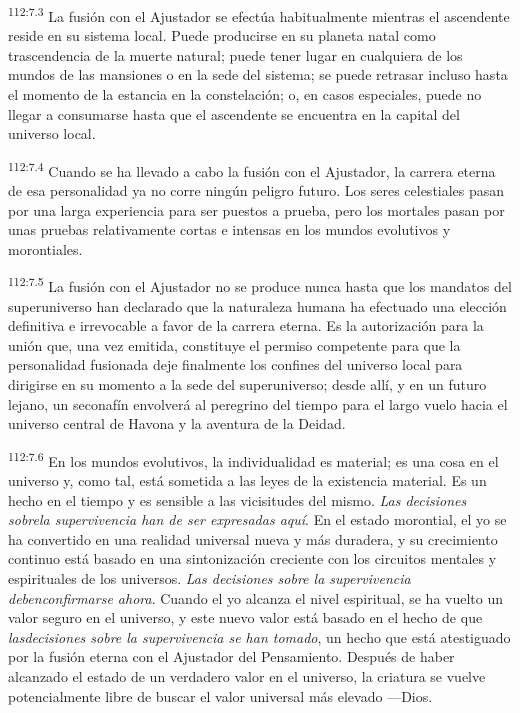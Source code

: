 \par
\textsuperscript{112:7.3} La fusión con el Ajustador se efectúa habitualmente mientras el ascendente reside en su sistema local. Puede producirse en su planeta natal como trascendencia de la muerte natural; puede tener lugar en cualquiera de los mundos de las mansiones o en la sede del sistema; se puede retrasar incluso hasta el momento de la estancia en la constelación; o, en casos especiales, puede no llegar a consumarse hasta que el ascendente se encuentra en la capital del universo local.

\par
\textsuperscript{112:7.4} Cuando se ha llevado a cabo la fusión con el Ajustador, la carrera eterna de esa personalidad ya no corre ningún peligro futuro. Los seres celestiales pasan por una larga experiencia para ser puestos a prueba, pero los mortales pasan por unas pruebas relativamente cortas e intensas en los mundos evolutivos y morontiales.

\par
\textsuperscript{112:7.5} La fusión con el Ajustador no se produce nunca hasta que los mandatos del superuniverso han declarado que la naturaleza humana ha efectuado una elección definitiva e irrevocable a favor de la carrera eterna. Es la autorización para la unión que, una vez emitida, constituye el permiso competente para que la personalidad fusionada deje finalmente los confines del universo local para dirigirse en su momento a la sede del superuniverso; desde allí, y en un futuro lejano, un seconafín envolverá al peregrino del tiempo para el largo vuelo hacia el universo central de Havona y la aventura de la Deidad.

\par
\textsuperscript{112:7.6} En los mundos evolutivos, la individualidad es material; es una cosa en el universo y, como tal, está sometida a las leyes de la existencia material. Es un hecho en el tiempo y es sensible a las vicisitudes del mismo. \textit{Las decisiones sobrela supervivencia han de ser expresadas aquí}. En el estado morontial, el yo se ha convertido en una realidad universal nueva y más duradera, y su crecimiento continuo está basado en una sintonización creciente con los circuitos mentales y espirituales de los universos. \textit{Las decisiones sobre la supervivencia debenconfirmarse ahora}. Cuando el yo alcanza el nivel espiritual, se ha vuelto un valor seguro en el universo, y este nuevo valor está basado en el hecho de que \textit{lasdecisiones sobre la supervivencia se han tomado}, un hecho que está atestiguado por la fusión eterna con el Ajustador del Pensamiento. Después de haber alcanzado el estado de un verdadero valor en el universo, la criatura se vuelve potencialmente libre de buscar el valor universal más elevado ---Dios.

